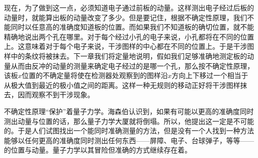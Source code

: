 现在，为了做到这一点，必须知道电子通过前板的动量。这样测出电子经过后板的动量时，就能算出板的动量改变了多少。但是要记住，根据不确定性原理，我们不能同时以任意高的准确度知道板的位置。而如果我们不知道板的确切位置，就不能精确地说出两个孔在哪里。对于每个经过小孔的电子来说，小孔都将在不同的位置上。这意味着对于每个电子来说，干涉图样的中心都在不同的位置上。于是干涉图样中的条纹将被抹去。下一章我们将定量地说明，假如我们足够准确地测定板的动量从而由反冲的动量的测量来确定电子经过的是哪一个孔，那么按不确定性原理，该板$x$位置的不确定量将使在检测器处观察到的图样沿$x$方向上下移过一个相当于从极大值到最近的极小值之间的距离。这样一种无规则的移动正好将干涉图样抹去，因而观察不到干涉现象。

不确定性原理“保护”着量子力学。海森伯认识到，如果有可能以更高的准确度同时测出动量与位置的话，那么量子力学大厦就将倒塌。所以，他提出这一定是不可能的。于是人们试图找出一个能同时准确测量的方法，但是没有一个人找到一种方法能够以任何更高的准确度同时测出任何东西——屏障、电子、台球弹子，等等——的位置与动量。量子力学以其冒险但准确的方式继续存在着。